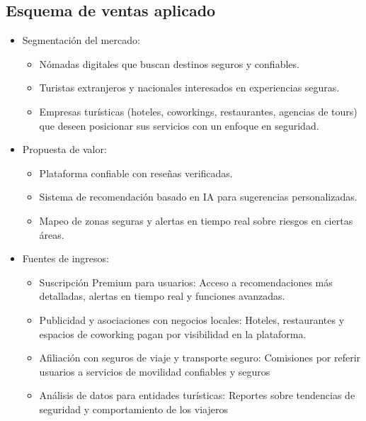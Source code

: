 \subsection{Esquema de ventas aplicado}

\begin{itemize}
    \item Segmentación del mercado:
    \begin{itemize}
        \item Nómadas digitales que buscan destinos seguros y confiables.
    \item Turistas extranjeros y nacionales interesados en experiencias seguras.
    \item Empresas turísticas (hoteles, coworkings, restaurantes, agencias de tours) que deseen posicionar sus servicios con un enfoque en seguridad.
    \end{itemize}
    \item Propuesta de valor:
    \begin{itemize}
        \item Plataforma confiable con reseñas verificadas.
        \item Sistema de recomendación basado en IA para sugerencias personalizadas.
        \item Mapeo de zonas seguras y alertas en tiempo real sobre riesgos en ciertas áreas.
    \end{itemize}
    \item Fuentes de ingresos:
    \begin{itemize}
        \item Suscripción Premium para usuarios: Acceso a recomendaciones más detalladas, alertas en tiempo real y funciones avanzadas.
        \item Publicidad y asociaciones con negocios locales: Hoteles, restaurantes y espacios de coworking pagan por visibilidad en la plataforma.
        \item Afiliación con seguros de viaje y transporte seguro: Comisiones por referir usuarios a servicios de movilidad confiables y seguros
         \item Análisis de datos para entidades turísticas:  Reportes sobre tendencias de seguridad y comportamiento de los viajeros
    \end{itemize}
    

\end{itemize}
